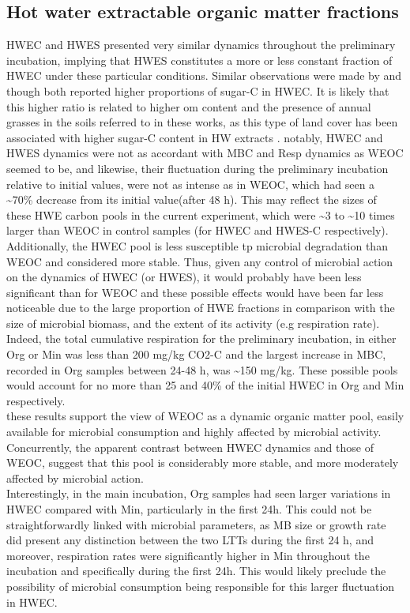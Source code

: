\documentclass[12pt]{report}
\begin{document}
		
		\subsection{Hot water extractable organic matter fractions}
		HWEC and HWES presented very similar dynamics throughout the preliminary incubation, implying that HWES constitutes  a more or less constant fraction of HWEC under these particular conditions. Similar observations were made by \citet{haynes2005} and \citet{ghani2000, ghani2003} though both reported higher proportions of sugar-C in HWEC. It is likely that this higher ratio is related to higher \gls{om} content and the presence of annual grasses in the soils referred to in these works, as this type of land cover has been associated with higher sugar-C content in HW extracts \citep{haynes1993}.
		notably, HWEC and HWES dynamics were not as accordant with MBC and Resp dynamics as WEOC seemed to be, and likewise, their fluctuation during the preliminary incubation relative to initial values, were not as intense as in WEOC, which had seen a \~{}70\% decrease from its initial value(after 48 h). This may reflect the sizes of these HWE carbon pools in the current experiment, which were \~{}3 to \~{}10 times larger than WEOC in control samples (for HWEC and HWES-C respectively). Additionally, the HWEC pool is less susceptible tp microbial degradation than WEOC and  considered more stable. Thus, given any control of microbial action on the dynamics of HWEC (or HWES), it would probably have been less significant than for WEOC and these possible effects would have been far less noticeable due to the large proportion of HWE fractions in comparison with the size of microbial biomass, and the extent of its activity (e.g respiration rate). Indeed, the total cumulative respiration  for the preliminary incubation, in either Org or Min was less than 200 mg/kg CO2-C and the largest increase in MBC, recorded in Org samples between 24-48 h, was \~{}150 mg/kg. These possible pools would account for no more than 25 and 40\% of the initial HWEC in Org and Min respectively. \\
		these results support the view of WEOC as a dynamic organic matter pool, easily available for microbial consumption and highly affected by microbial activity. Concurrently, the apparent contrast between HWEC dynamics and those of WEOC, suggest that this pool is considerably more stable, and more moderately affected by microbial action.\\
		Interestingly, in the main incubation, Org samples had seen larger variations in HWEC compared with Min, particularly in the first 24h. This could not be straightforwardly linked with microbial parameters, as MB size or growth rate did present any distinction between the two LTTs during the first 24 h, and moreover, respiration rates were significantly higher in Min throughout the incubation and specifically during the first 24h. This would likely preclude the possibility of microbial consumption being responsible for this larger fluctuation in HWEC.\\
\end{document}
